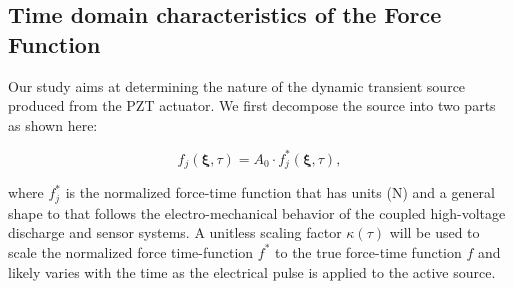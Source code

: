 \documentclass[preprint,3p, 11pt,authoryear]{elsarticle}
\begin{document}
\subsection{Time domain characteristics of the Force Function}
\label{force_time}

Our study aims at determining the nature of the dynamic transient source produced from the PZT actuator. We first decompose the source into two parts as shown here:

\begin{equation}
    \label{eq4}
    f_{j}\left( \mathbf{\xi}, \tau \right) =A_{0} \cdot f^{*}_{j}\left( \mathbf{\xi}, \tau \right) ,
\end{equation}

\noindent where $f^{*}_{j}$ is the normalized force-time function that has units (N) and a general shape to that follows the electro-mechanical behavior of the coupled high-voltage discharge and sensor systems.  A unitless scaling factor $\kappa(\tau)$ will be used to scale the normalized force time-function $f^{*}$ to the true force-time function $f$ and likely varies with the time as the electrical pulse is applied to the active source.
\end{document}
